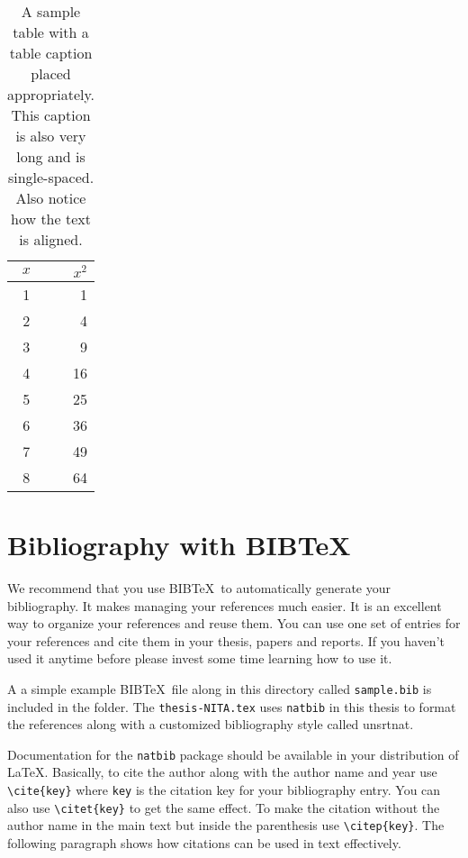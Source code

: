 \begin{table}[htbp]
  \caption{A sample table with a table caption placed
    appropriately. This caption is also very long and is
    single-spaced.  Also notice how the text is aligned.}
  \begin{center}
  \begin{tabular}[c]{|c|r|} \hline
    $x$ & $x^2$ \\ \hline
    1  &  1   \\
    2  &  4  \\
    3  &  9  \\
    4  &  16  \\
    5  &  25  \\
    6  &  36  \\
    7  &  49  \\
    8  &  64  \\ \hline
  \end{tabular}
  \label{tab:sample}
  \end{center}
\end{table}

\section{Bibliography with BIB\TeX}

We recommend that you use BIB\TeX\ to automatically generate
your bibliography.  It makes managing your references much easier.  It
is an excellent way to organize your references and reuse them.  You
can use one set of entries for your references and cite them in your
thesis, papers and reports.  If you haven't used it anytime before
please invest some time learning how to use it.  

A a simple example BIB\TeX\ file along in this directory
called \verb+sample.bib+ is included in the folder.  The \verb+thesis-NITA.tex+ uses \verb+natbib+ in this thesis  to format the references along with a customized bibliography
style called unsrtnat.
\par Documentation for the \verb+natbib+ package should
be available in your distribution of \LaTeX.  Basically, to cite the
author along with the author name and year use \verb+\cite{key}+ where
\verb+key+ is the citation key for your bibliography entry.  You can
also use \verb+\citet{key}+ to get the same effect.  To make the
citation without the author name in the main text but inside the
parenthesis use \verb+\citep{key}+.  The following paragraph shows how
citations can be used in text effectively.


